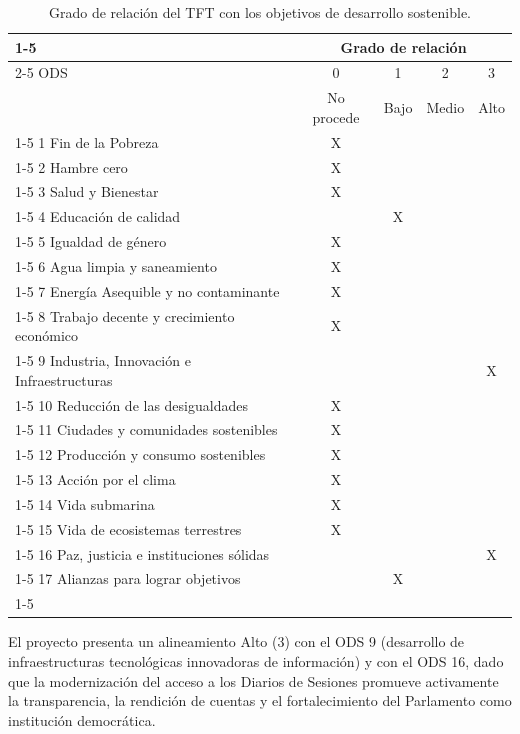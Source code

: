 \documentclass[oneside,12pt]{book}
\begin{document}
\begin{table}[!htbp]
\caption{Grado de relación del TFT con los objetivos de desarrollo sostenible.}
\label{tab:ODS}
\centering
\begin{tabular}{|l|c|c|c|c|}
\cline{1-5}
  & \multicolumn{4}{c|}{Grado de relación} \\ \cline{2-5} 
 ODS & 0 & 1 & 2 & 3 \\
  & No procede & Bajo & Medio & Alto \\  
  \cline{1-5} 
1 Fin de la Pobreza & X & & & \\ \cline{1-5}
2 Hambre cero & X & & & \\ \cline{1-5}
3 Salud y Bienestar & X & & & \\ \cline{1-5}
4 Educación de calidad & & X & & \\ \cline{1-5}
5 Igualdad de género & X & & & \\ \cline{1-5}
6 Agua limpia y saneamiento & X & & & \\ \cline{1-5}
7 Energía Asequible y no contaminante & X & & & \\ \cline{1-5}
8 Trabajo decente y crecimiento económico & X & & & \\ \cline{1-5}
9 Industria, Innovación e Infraestructuras & & & & X \\ \cline{1-5}
10 Reducción de las desigualdades & X & & & \\ \cline{1-5}
11 Ciudades y comunidades sostenibles & X & & & \\ \cline{1-5}
12 Producción y consumo sostenibles & X & & & \\ \cline{1-5} 
13 Acción por el clima & X & & & \\ \cline{1-5}
14 Vida submarina & X & & & \\ \cline{1-5}
15 Vida de ecosistemas terrestres & X & & & \\ \cline{1-5}
16 Paz, justicia e instituciones sólidas & & & & X \\ \cline{1-5}
17 Alianzas para lograr objetivos & & X & & \\ \cline{1-5}
\end{tabular}%
\end{table}

El proyecto presenta un alineamiento Alto (3) con el ODS 9 (desarrollo de infraestructuras tecnológicas innovadoras de información) y con el ODS 16, dado que la modernización del acceso a los Diarios de Sesiones promueve activamente la transparencia, la rendición de cuentas y el fortalecimiento del Parlamento como institución democrática.
\end{document}
